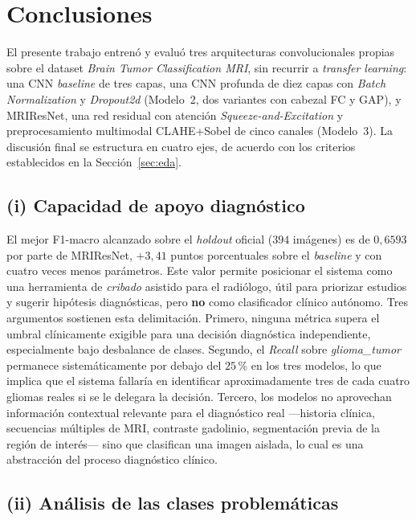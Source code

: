 \section{Conclusiones}
\label{sec:conclusiones}

El presente trabajo entrenó y evaluó tres arquitecturas
convolucionales propias sobre el dataset
\textit{Brain Tumor Classification MRI}, sin recurrir a
\textit{transfer learning}: una CNN \textit{baseline} de
tres capas, una CNN profunda de diez capas con
\textit{Batch Normalization} y \textit{Dropout2d}
(Modelo~2, dos variantes con cabezal FC y GAP), y MRIResNet,
una red residual con atención \textit{Squeeze-and-Excitation}
y preprocesamiento multimodal CLAHE+Sobel de cinco canales
(Modelo~3). La discusión final se estructura en cuatro ejes,
de acuerdo con los criterios establecidos en la
Sección~\ref{sec:eda}.

\subsection*{(i) Capacidad de apoyo diagnóstico}

El mejor F1-macro alcanzado sobre el \textit{holdout} oficial
($394$ imágenes) es de $0{,}6593$ por parte de MRIResNet,
$+3{,}41$ puntos porcentuales sobre el \textit{baseline} y
con cuatro veces menos parámetros. Este valor permite
posicionar el sistema como una herramienta de \emph{cribado}
asistido para el radiólogo, útil para priorizar estudios y
sugerir hipótesis diagnósticas, pero \textbf{no} como
clasificador clínico autónomo. Tres argumentos sostienen esta
delimitación. Primero, ninguna métrica supera el umbral
clínicamente exigible para una decisión diagnóstica
independiente, especialmente bajo desbalance de clases.
Segundo, el \textit{Recall} sobre \textit{glioma\_tumor}
permanece sistemáticamente por debajo del $25$\,\% en los tres
modelos, lo que implica que el sistema fallaría en identificar
aproximadamente tres de cada cuatro gliomas reales si se le
delegara la decisión. Tercero, los modelos no aprovechan
información contextual relevante para el diagnóstico real
---historia clínica, secuencias múltiples de MRI, contraste
gadolinio, segmentación previa de la región de interés---
sino que clasifican una imagen aislada, lo cual es una
abstracción del proceso diagnóstico clínico.

\subsection*{(ii) Análisis de las clases problemáticas}

